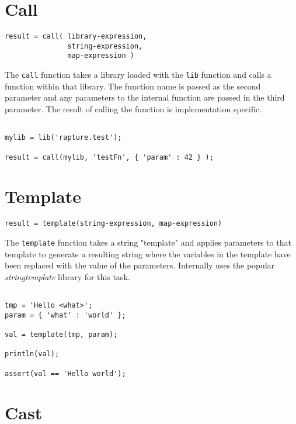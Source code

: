 \section{Call}

\begin{Verbatim}
result = call( library-expression, 
               string-expression, 
               map-expression )
\end{Verbatim}

The \Verb+call+ function takes a library loaded with the \verb+lib+ function and calls a function within that library. The function name is passed as the second parameter and any parameters to the internal function are passed in the third parameter. The result of calling the function is implementation specific.

\begin{lstlisting}[caption={Call example}]

mylib = lib('rapture.test');

result = call(mylib, 'testFn', { 'param' : 42 } );

\end{lstlisting}

\section{Template}

\begin{Verbatim}
result = template(string-expression, map-expression)
\end{Verbatim}

The \Verb+template+ function takes a string "template" and applies parameters to that template to generate a resulting string where the variables in the template have been replaced with the value of the parameters. Internally \Reflex uses the popular \emph{stringtemplate} library for this task.

\begin{lstlisting}[caption={Template example}]

tmp = 'Hello <what>';
param = { 'what' : 'world' };

val = template(tmp, param);

println(val);

assert(val == 'Hello world');

\end{lstlisting}

\section{Cast}

